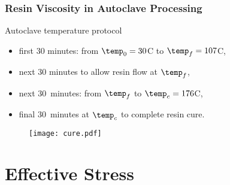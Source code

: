 \documentclass[compress]{beamer}%
\begin{document}
\begin{frame}
  \frametitle{Resin Viscosity in Autoclave Processing}
  Autoclave temperature protocol
  \begin{itemize}
  \item first $30$ minutes: from $\temp_0=30$\degree C to $\temp_f=107$\degree C,
  \item next $30$ minutes to allow resin flow at $\temp_f$,
  \item next $30$~minutes: from $\temp_f$ to $\temp_c=176$\degree C,
  \item final $30$~minutes at $\temp_c$ to complete resin cure.
  \end{itemize}
\begin{figure}
  \centering
  \texttt{[image: cure.pdf]}
  \label{fig:cure-exp}
\end{figure}

\end{frame}

\section{Effective Stress}
\end{document}
